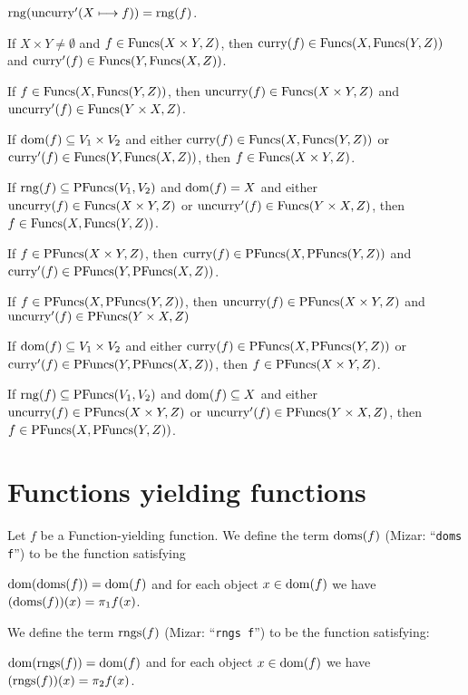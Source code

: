 \documentclass{article}
\begin{document}
\begin{thm}
  $\rng(\uncurry'(X\constantto f))=\rng(f)$.
\item\label{funct6:10} If $X\times Y\neq\emptyset$ and
  $f\in\Funcs(X\times Y,Z)$, then $\curry(f)\in\Funcs(X,\Funcs(Y,Z))$
  and $\curry'(f)\in\Funcs(Y,\Funcs(X,Z))$.
\item\label{funct6:11} If $f\in\Funcs(X,\Funcs(Y,Z))$, then
  $\uncurry(f)\in\Funcs(X\times Y,Z)$ and $\uncurry'(f)\in\Funcs(Y\times X,Z)$.
\item\label{funct6:12} If $\dom(f)\subset V_{1}\times V_{2}$ and either $\curry(f)\in\Funcs(X,\Funcs(Y,Z))$
  or $\curry'(f)\in\Funcs(Y,\Funcs(X,Z))$,
  then $f\in\Funcs(X\times Y,Z)$.
\item\label{funct6:13} If $\rng(f)\subset\PFuncs(V_{1},V_{2})$ and $\dom(f)=X$
  and either $\uncurry(f)\in\Funcs(X\times Y,Z)$
  or $\uncurry'(f)\in\Funcs(Y\times X,Z)$,
  then $f\in\Funcs(X,\Funcs(Y,Z))$.
\item\label{funct6:14} If $f\in\PFuncs(X\times Y,Z)$,
  then $\curry(f)\in\PFuncs(X,\PFuncs(Y,Z))$ and
  $\curry'(f)\in\PFuncs(Y,\PFuncs(X,Z))$.
\item\label{funct6:15} If $f\in\PFuncs(X,\PFuncs(Y,Z))$,
  then $\uncurry(f)\in\PFuncs(X\times Y,Z)$
  and $\uncurry'(f)\in\PFuncs(Y\times X,Z)$
\item\label{funct6:16} If $\dom(f)\subset V_{1}\times V_{2}$ and either $\curry(f)\in\PFuncs(X,\PFuncs(Y,Z))$
  or $\curry'(f)\in\PFuncs(Y,\PFuncs(X,Z))$,
  then $f\in\PFuncs(X\times Y,Z)$.
\item\label{funct6:17} If $\rng(f)\subset\PFuncs(V_{1},V_{2})$ and
  $\dom(f)\subset X$
  and either $\uncurry(f)\in\PFuncs(X\times Y,Z)$
  or $\uncurry'(f)\in\PFuncs(Y\times X,Z)$,
  then $f\in\PFuncs(X,\PFuncs(Y,Z))$.
\end{thm}

\section{Functions yielding functions}

\skipdefn

\begin{definition}
Let $f$ be a Function-yielding function. We define the term $\doms(f)$
(Mizar: ``\verb#doms f#'') to be the function satisfying
\begin{defn}[start=2]
\item $\dom(\doms(f))=\dom(f)$ and for each object $x\in\dom(f)$ we have $(\doms(f))(x)=\proj1{f(x)}$.
\end{defn}
We define the term $\rngs(f)$ (Mizar: ``\verb#rngs f#'') to be the
function satisfying:
\begin{defn}
\item $\dom(\rngs(f))=\dom(f)$ and for each object $x\in\dom(f)$ we have $(\rngs(f))(x)=\proj2{f(x)}$.
\end{defn}
\end{definition}
\end{document}
